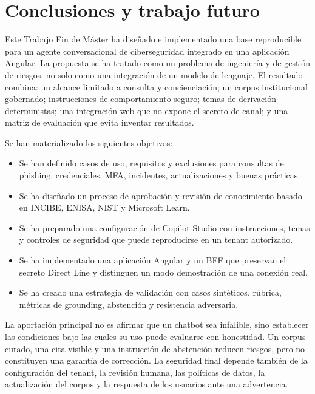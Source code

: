 \chapter{Conclusiones y trabajo futuro}
\label{chap:conclusiones}

Este Trabajo Fin de M\'aster ha dise\~nado e implementado una base reproducible para un agente conversacional de ciberseguridad integrado en una aplicaci\'on Angular. La propuesta se ha tratado como un problema de ingenier\'ia y de gesti\'on de riesgos, no solo como una integraci\'on de un modelo de lenguaje. El resultado combina: un alcance limitado a consulta y concienciaci\'on; un corpus institucional gobernado; instrucciones de comportamiento seguro; temas de derivaci\'on deterministas; una integraci\'on web que no expone el secreto de canal; y una matriz de evaluaci\'on que evita inventar resultados.

Se han materializado los siguientes objetivos:

\begin{itemize}
  \item Se han definido casos de uso, requisitos y exclusiones para consultas de phishing, credenciales, MFA, incidentes, actualizaciones y buenas pr\'acticas.
  \item Se ha dise\~nado un proceso de aprobaci\'on y revisi\'on de conocimiento basado en INCIBE, ENISA, NIST y Microsoft Learn.
  \item Se ha preparado una configuraci\'on de Copilot Studio con instrucciones, temas y controles de seguridad que puede reproducirse en un tenant autorizado.
  \item Se ha implementado una aplicaci\'on Angular y un BFF que preservan el secreto Direct Line y distinguen un modo demostraci\'on de una conexi\'on real.
  \item Se ha creado una estrategia de validaci\'on con casos sint\'eticos, r\'ubrica, m\'etricas de grounding, abstenci\'on y resistencia adversaria.
\end{itemize}

La aportaci\'on principal no es afirmar que un chatbot sea infalible, sino establecer las condiciones bajo las cuales su uso puede evaluarse con honestidad. Un corpus curado, una cita visible y una instrucci\'on de abstenci\'on reducen riesgos, pero no constituyen una garant\'ia de correcci\'on. La seguridad final depende tambi\'en de la configuraci\'on del tenant, la revisi\'on humana, las pol\'iticas de datos, la actualizaci\'on del corpus y la respuesta de los usuarios ante una advertencia.

